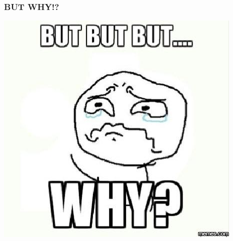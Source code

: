 \documentclass[aspectratio=169]{beamer}
\begin{document}
\begin{frame}
  \frametitle{BUT WHY!?}
  \begin{center}
    \includegraphics[scale=0.25]{butwhy}
  \end{center}
\end{frame}
\end{document}
